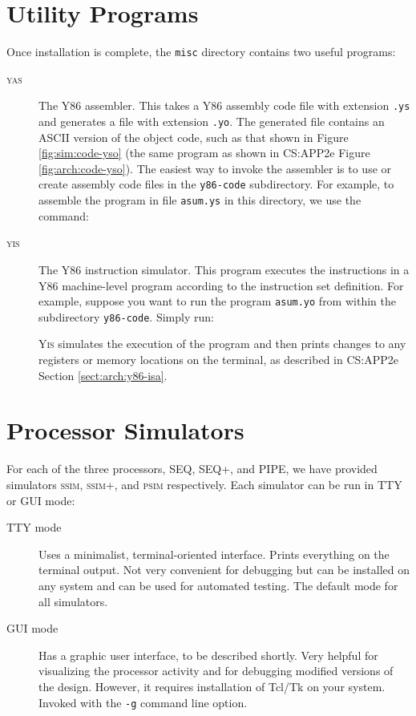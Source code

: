 \documentclass[11pt]{article}
\begin{document}
\section{Utility Programs}

Once installation is complete, the \texttt{misc} directory contains
two useful programs:

\begin{description}
\item[\textsc{yas}] The Y86 assembler.  This takes a Y86 assembly code
file with extension \texttt{.ys} and generates a file with
extension \texttt{.yo}.  The generated file contains an ASCII
version of the object code, such as that shown in Figure
\ref{fig:sim:code-yso} (the same program as shown in CS:APP2e Figure
\ref{fig:arch:code-yso}).  The easiest way to invoke the assembler is
to use or create assembly code files in the \texttt{y86-code}
subdirectory.  For example, to assemble the program in file
\texttt{asum.ys} in this directory, we use the command:
\begin{tty}
\end{tty}

\item[\textsc{yis}] The Y86 instruction simulator.  This program
executes the instructions in a Y86 machine-level program according to
the instruction set definition.  For example, suppose you want to run
the program \texttt{asum.yo} from within the subdirectory
\texttt{y86-code}.  Simply run:

\begin{tty}
\end{tty}

\textsc{Yis} simulates the execution of the program and then prints
 changes to any registers or memory locations on the terminal, as
 described in CS:APP2e Section \ref{sect:arch:y86-isa}.
\end{description}

\section{Processor Simulators}

For each of the three processors, SEQ, SEQ+, and PIPE, we have
provided simulators \textsc{ssim}, \textsc{ssim+}, and
\textsc{psim} respectively. Each simulator can be run in 
TTY or GUI mode:

\begin{description}
\item [TTY mode]
Uses a minimalist, terminal-oriented interface.  Prints
everything on the terminal output.  Not very convenient for debugging
but can be installed on any system and can be used for
automated testing. The default mode for all simulators.

\item [GUI mode]
Has a graphic user interface, to be described shortly.  Very helpful
for visualizing the processor activity and for debugging modified
versions of the design.  However, it requires installation of Tcl/Tk on
your system. Invoked with the \texttt{-g} command line option.

\end{description}
\end{document}
